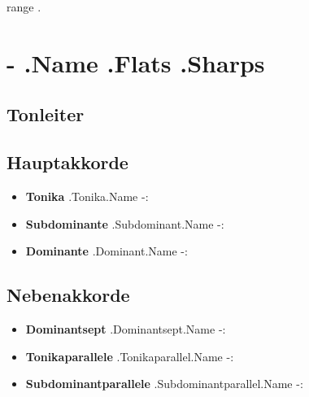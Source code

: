 \documentclass{article}
\begin{document}
{{ range . }}

\section*{ {{- .Name }} %
{{ .Flats }}{{ .Sharps }}}

\begin{multicols}{2}
\subsection*{Tonleiter}



\subsection*{Hauptakkorde}

\begin{itemize}
\item \textbf{Tonika} {{ .Tonika.Name -}}: 


\item \textbf{Subdominante} {{ .Subdominant.Name -}}:


\item \textbf{Dominante} {{ .Dominant.Name -}}:

\end{itemize}


\subsection*{Nebenakkorde}

\begin{itemize}
\item \textbf{Dominantsept} {{ .Dominantsept.Name -}}: 


\item \textbf{Tonikaparallele} {{ .Tonikaparallel.Name -}}:


\item \textbf{Subdominantparallele} {{ .Subdominantparallel.Name -}}: 


\end{itemize}
\end{multicols}
\end{document}
